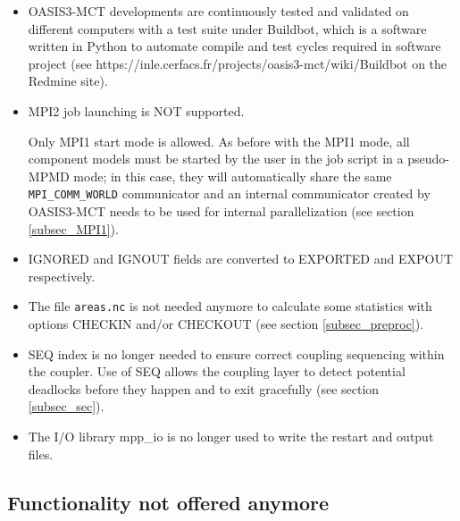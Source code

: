\begin{itemize}
\item OASIS3-MCT developments are continuously tested and
  validated on different computers with a test suite under Buildbot,
  which is a software written in Python to automate compile and test
  cycles required in software project (see
  https://inle.cerfacs.fr/projects/oasis3-mct/wiki/Buildbot on the
  Redmine site).

\item MPI2 job launching is NOT supported. 

  Only MPI1 start mode is allowed. As before with the MPI1 mode, all
  component models must be started by the user in the job script in a
  pseudo-MPMD mode; in this case, they will automatically share the
  same {\tt MPI\_COMM\_WORLD} communicator and an internal
  communicator created by OASIS3-MCT needs to be used for internal
  parallelization (see section \ref{subsec_MPI1}).
\item IGNORED and IGNOUT fields are converted to EXPORTED and EXPOUT
  respectively.

\item The file {\tt areas.nc} is not needed anymore to calculate some
  statistics with options CHECKIN and/or CHECKOUT (see section \ref{subsec_preproc}).

\item SEQ index is no longer needed to ensure correct coupling
  sequencing within the coupler. Use of SEQ allows the coupling layer
  to detect potential deadlocks before they happen and to exit
  gracefully (see section \ref{subsec_sec}).

\item The I/O library mpp\_io is no longer used to write the restart
  and output files.

\end{itemize}


\subsection{Functionality not offered anymore}
\label{sec_changes_old}

